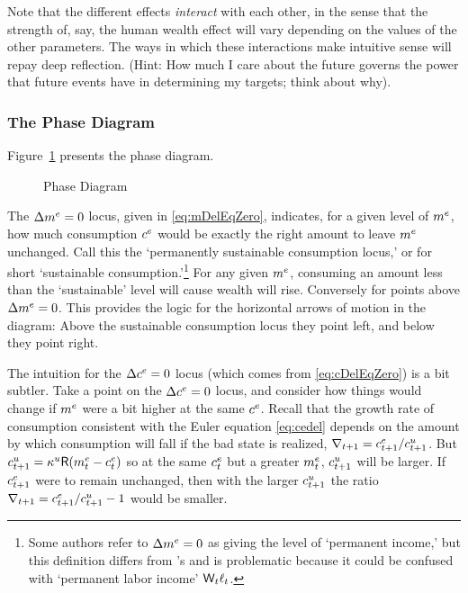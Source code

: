 \documentclass{handout}
\begin{document}
Note that the different effects {\it interact} with each other, in the
sense that the strength of, say, the human wealth effect will vary
depending on the values of the other parameters.  The ways in which
these interactions make intuitive sense will repay deep reflection.
(Hint: How much I care about the future governs the power that future
events have in determining my targets; think about why).

\subsubsection{The Phase Diagram}

Figure~\ref{fig:PhaseDiag} presents the phase diagram.
\begin{figure}
\caption{Phase Diagram}\label{fig:PhaseDiag}
\end{figure}


The $\Delta \mRatE_{\tSS} = 0$ locus, given in \eqref{eq:mDelEqZero},
indicates, for a given level of $\mRatE_{\tSS}$, how much consumption
$\cRatE_{\tSS}$ would be exactly the right amount to leave $m^{e}$
unchanged.  Call this the `permanently sustainable consumption locus,' or for short `sustainable consumption.'\footnote{Some authors refer to $\Delta \mRatE_{\tSS} = 0$ as giving the level of `permanent income,' but this definition differs from \cite{friedmanATheory}'s and is 
problematic because it could be confused with `permanent labor income' $\mathsf{W}_{t} \ell_{t}$.}  For any given $m^{e}$, consuming an amount less than the `sustainable' level will cause wealth will rise.
Conversely for points above $\Delta m^{e} =0$.  This provides the logic for
the horizontal arrows of motion in the diagram: Above the sustainable consumption locus
they point left, and below they point right.


The intuition for the $\Delta \cRatE_{\tSS}=0$ locus (which comes from
\eqref{eq:cDelEqZero}) is a bit subtler.  Take a point on 
the $\Delta \cRatE_{\tSS}=0$ locus, and consider how things 
would change if $m^{e}$ were a bit higher at the same $c^{e}$.  
Recall that the growth rate of consumption consistent with 
the Euler equation \eqref{eq:cedel} depends on the amount by which consumption will
fall if the bad state is realized, $\nabla_{t+1} = c^{e}_{t+1}/c^{u}_{t+1}$.  
But $c^{u}_{t+1} = \kappa^{u} \mathsf{R} (m^{e}_{t} - c^{e}_{t})$ so at the same $c^{e}_{t}$ but 
a greater $m^{e}_{t}$, $c^{u}_{t+1}$ will be larger.  If $c^{e}_{t+1}$ were to remain
unchanged, then with the larger $c^{u}_{t+1}$ the ratio $\nabla_{t+1} = c^{e}_{t+1}/c^{u}_{t+1}-1$ would 
be smaller.
\end{document}
